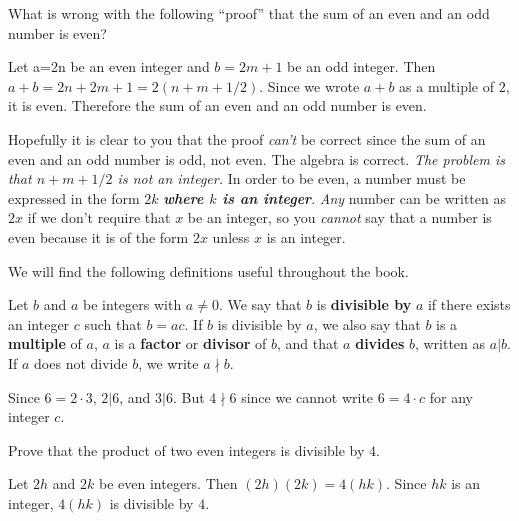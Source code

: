 \begin{ques}
What is wrong with the following ``proof'' that the sum of an even and an odd number is even?
\begin{spf}
Let a=2n be an even integer and $b=2m+1$ be an odd integer.  
Then $a+b=2n+2m+1=2(n+m+1/2)$.  Since we wrote $a+b$ as a multiple of $2$, it is even.
Therefore the sum of an even and an odd number is even.
\end{spf}
\answerlinetwo
\begin{answer}
Hopefully it is clear to you that the proof {\em can't} be correct since the sum of an even and an odd number is odd, not even.
The algebra is correct.  
{\em The problem is that $n+m+1/2$ is not an integer.}
In order to be even, a number must be expressed 
in the form $2k$ {\bf\em where $k$ is an integer}.  {\em Any} number can be written as $2x$ if we don't require that $x$ be an integer,
so you {\em cannot} say that a number is even because it is of the form $2x$ unless $x$ is an integer.
\end{answer}
\end{ques}

We will find the following definitions useful throughout the book.

\begin{df}
Let $b$ and $a$ be integers with $a\neq 0$.  We say that 
$b$ is {\bf divisible by} $a$ if there exists an integer $c$ such
that $b = ac$. 
If $b$ is divisible by $a$, 
we also say that $b$ is a {\bf multiple} of $a$,
$a$ is a {\bf factor} or {\bf divisor} of $b$, and that 
$a$ {\bf divides} $b$, written as $a|b$.  If $a$ does not divide $b$, we write $a\nmid b$. 
\end{df}

\vspace*{-.1in}

\begin{exa}
Since $6=2\cdot 3$, $2|6$, and $3|6$.  But $4\nmid 6$ since we cannot write $6=4\cdot c$ for any integer $c$.
\end{exa}

\vspace*{-.1in}

\begin{exa}
Prove that the product of two even integers is
divisible by $4$.
\begin{pf}
Let  $2h$ and
$2k$ be even integers. Then $(2h)(2k) = 4(hk)$. Since $hk$ is an
integer, $4(hk)$ is  divisible by $4$. 
\end{pf}
\end{exa}

